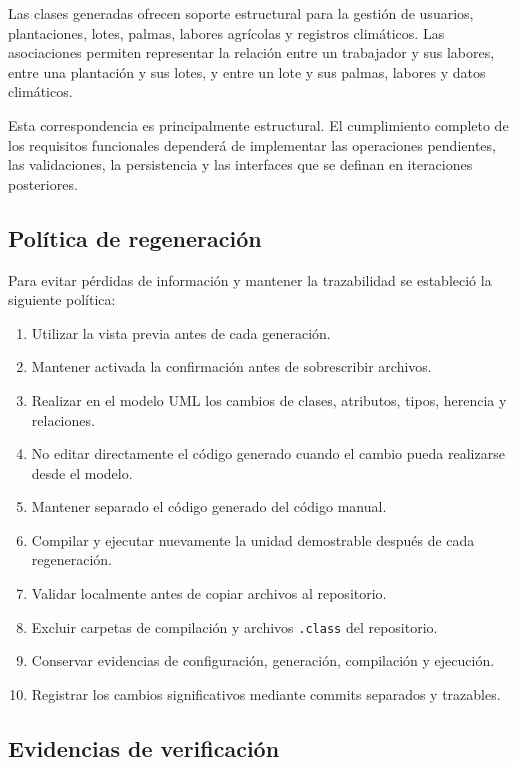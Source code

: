Las clases generadas ofrecen soporte estructural para la gestión de usuarios, plantaciones, lotes, palmas, labores agrícolas y registros climáticos. Las asociaciones permiten representar la relación entre un trabajador y sus labores, entre una plantación y sus lotes, y entre un lote y sus palmas, labores y datos climáticos.

Esta correspondencia es principalmente estructural. El cumplimiento completo de los requisitos funcionales dependerá de implementar las operaciones pendientes, las validaciones, la persistencia y las interfaces que se definan en iteraciones posteriores.

\subsection{Política de regeneración}

Para evitar pérdidas de información y mantener la trazabilidad se estableció la siguiente política:

\begin{enumerate}
    \item Utilizar la vista previa antes de cada generación.
    \item Mantener activada la confirmación antes de sobrescribir archivos.
    \item Realizar en el modelo UML los cambios de clases, atributos, tipos, herencia y relaciones.
    \item No editar directamente el código generado cuando el cambio pueda realizarse desde el modelo.
    \item Mantener separado el código generado del código manual.
    \item Compilar y ejecutar nuevamente la unidad demostrable después de cada regeneración.
    \item Validar localmente antes de copiar archivos al repositorio.
    \item Excluir carpetas de compilación y archivos \texttt{.class} del repositorio.
    \item Conservar evidencias de configuración, generación, compilación y ejecución.
    \item Registrar los cambios significativos mediante commits separados y trazables.
\end{enumerate}

\subsection{Evidencias de verificación}

